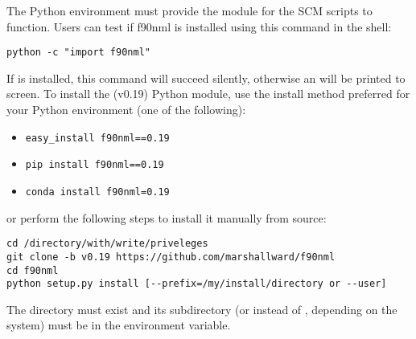 The Python environment must provide the  module for the SCM scripts to function. Users can test if f90nml is installed using this command in the shell:
\begin{lstlisting}
python -c "import f90nml"
\end{lstlisting}
If  is installed, this command will succeed silently, otherwise an  will be printed to screen. To install the  (v0.19) Python module, use the install method preferred for your Python environment (one of the following):
\begin{itemize}
\item
\begin{lstlisting}
easy_install f90nml==0.19
\end{lstlisting}
\end{itemize}
\begin{itemize}
\item
\begin{lstlisting}
pip install f90nml==0.19
\end{lstlisting}
\end{itemize}
\begin{itemize}
\item
\begin{lstlisting}
conda install f90nml=0.19
\end{lstlisting}
\end{itemize}

or perform the following steps to install it manually from source:
\begin{lstlisting}
cd /directory/with/write/priveleges
git clone -b v0.19 https://github.com/marshallward/f90nml
cd f90nml
python setup.py install [--prefix=/my/install/directory or --user]
\end{lstlisting}
The directory  must exist and its subdirectory  (or  instead of , depending on the system) must be in the  environment variable.

